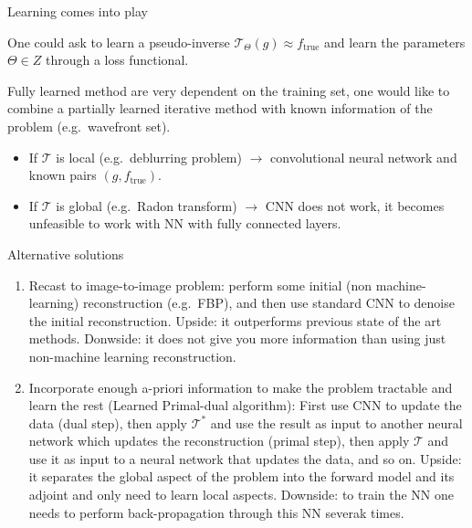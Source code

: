 \begin{frame}{Learning comes into play}

One could ask to learn a pseudo-inverse $\mathcal{T}_{\Theta}(g)\approx f_{\text{true}}$ and learn the parameters $\Theta\in Z$ through a loss functional. 

\pause

\bigskip

Fully learned method are very dependent on the training set, one would like to combine a partially learned iterative method with known information of the problem (e.g.\ wavefront set).

\pause

\bigskip

\begin{itemize}
\item If $\mathcal{T}$ is local (e.g.\ deblurring problem) $\longrightarrow$ convolutional neural network and known pairs $(g,f_{\text{true}})$.
\item If $\mathcal{T}$ is global (e.g.\ Radon transform) $\longrightarrow$ CNN does not work, it becomes unfeasible to work with NN with fully connected layers.
\end{itemize}
\end{frame}

\begin{frame}{Alternative solutions}
\begin{enumerate}
\item Recast to image-to-image problem: perform some initial (non machine-learning) reconstruction (e.g.\ FBP), and then use standard CNN to denoise the initial reconstruction. Upside: it outperforms previous state of the art methods. Donwside: it does not give you more information than using just non-machine learning reconstruction.

\pause 

\item Incorporate enough a-priori information to make the problem tractable and learn the rest (Learned Primal-dual algorithm): First use CNN to update the data (dual step), then apply $\mathcal{T}^*$ and use the result as input to another neural network which updates the reconstruction (primal step), then apply $\mathcal{T}$ and use it as input to a neural network that updates the data, and so on. Upside: it separates the global aspect of the problem into the forward model and its adjoint and only need to learn local aspects. Downside: to train the NN one needs to perform back-propagation through this NN severak times. 
\end{enumerate}
\end{frame}

